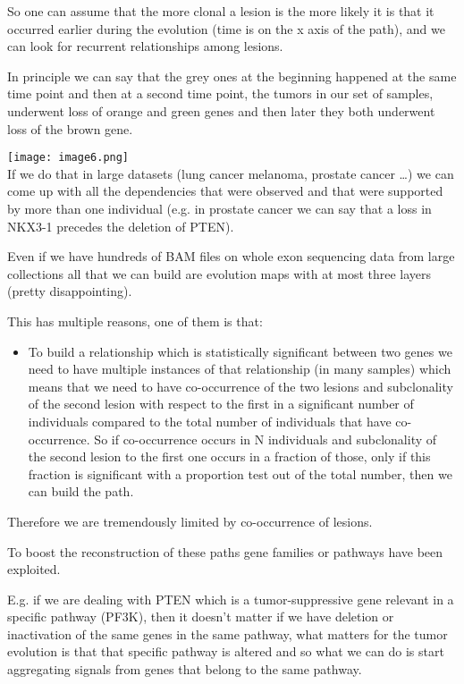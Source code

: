 So one can assume that the more clonal a lesion is the more likely it is that it
occurred earlier during the evolution (time is on the x axis of the path), and
we can look for recurrent relationships among lesions.

In principle we can say that the grey ones at the beginning happened at the same
time point and then at a second time point, the tumors in our set of samples,
underwent loss of orange and green genes and then later they both underwent loss
of the brown gene.

\texttt{[image: image6.png]}\\

If we do that in
large datasets (lung cancer melanoma, prostate cancer \ldots) we can come up
with all the dependencies that were observed and that were supported by more
than one individual (e.g. in prostate cancer we can say that a loss in NKX3-1
precedes the deletion of PTEN).

Even if we have hundreds of BAM files on whole exon sequencing data from large
collections all that we can build are evolution maps with at most three layers
(pretty disappointing).

This has multiple reasons, one of them is that:

\begin{itemize}
\item
  To build a relationship which is statistically significant between two genes
  we need to have multiple instances of that relationship (in many samples)
  which means that we need to have co-occurrence of the two lesions and
  subclonality of the second lesion with respect to the first in a significant
  number of individuals compared to the total number of individuals that have
  co-occurrence. So if co-occurrence occurs in N individuals and subclonality of
  the second lesion to the first one occurs in a fraction of those, only if this
  fraction is significant with a proportion test out of the total number, then
  we can build the path.
\end{itemize}

Therefore we are tremendously limited by co-occurrence of lesions.

To boost the reconstruction of these paths gene families or pathways have been
exploited.

E.g. if we are dealing with PTEN which is a tumor-suppressive gene relevant in a
specific pathway (PF3K), then it doesn't matter if we have deletion or
inactivation of the same genes in the same pathway, what matters for the tumor
evolution is that that specific pathway is altered and so what we can do is
start aggregating signals from genes that belong to the same pathway.

